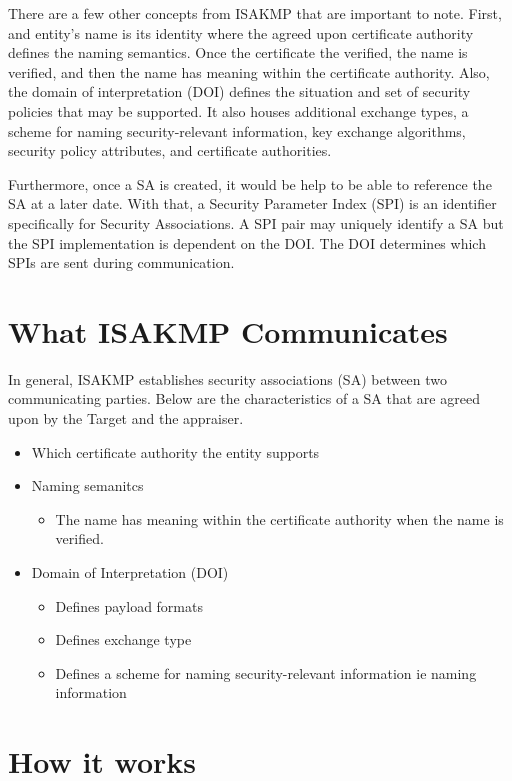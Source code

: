 \documentclass[10pt]{report}
\begin{document}
There are a few other concepts from ISAKMP that are important to note.
First, and entity's name is its identity where the agreed upon certificate
authority defines the naming semantics. Once the certificate the verified,
the name is verified, and then the name has meaning within the
certificate authority. Also, the domain of interpretation (DOI) defines the
situation and set of security policies that may be supported. It also houses
additional exchange types, a scheme for naming security-relevant information,
key exchange algorithms, security policy attributes, and certificate authorities. 

Furthermore, once a SA is created, it would be help to be able to reference the 
SA at a later date. With that, a Security Parameter Index (SPI) is an identifier 
specifically for Security Associations. A SPI pair may uniquely identify a SA but 
the SPI implementation is dependent on the DOI. The DOI determines which SPIs
are sent during communication.

\section{What ISAKMP Communicates}

In general, ISAKMP establishes security associations (SA) between two communicating
parties. Below are the characteristics of a SA that are agreed upon by the Target and 
the appraiser. 

\begin{itemize}
  \item Which certificate authority the entity supports
  \item Naming semanitcs
  	\begin{itemize}
	\item The name has meaning within the certificate authority
          when the name is verified. 
	\end{itemize}
  \item Domain of Interpretation (DOI)
  	\begin{itemize}
	  \item Defines payload formats
	  \item Defines exchange type
	  \item Defines a scheme for naming security-relevant
            information ie naming information
	\end{itemize}
\end{itemize}

\section{How it works}
\end{document}
